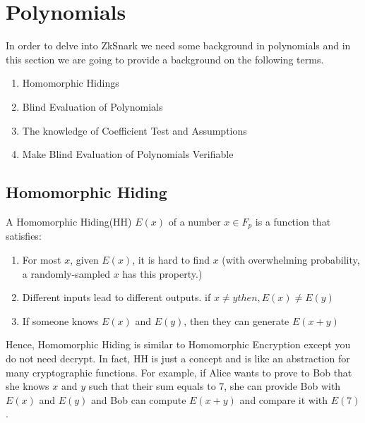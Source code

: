 \documentclass[twoside]{article}
\begin{document}
\section{Polynomials}
In order to delve into ZkSnark we need some background in polynomials and in this section we are going to provide a background on the following terms.
\begin{enumerate}[topsep=0pt,itemsep=-1ex,partopsep=1ex,parsep=1ex]
    \item Homomorphic Hidings
    \item Blind Evaluation of Polynomials
    \item The knowledge of Coefficient Test and Assumptions
    \item Make Blind Evaluation of Polynomials Verifiable
\end{enumerate}
\subsection{Homomorphic Hiding}
A Homomorphic Hiding(HH) $E(x)$ of a number $x \in F_p$ is a function that satisfies:
\begin{enumerate}[topsep=0pt,itemsep=-1ex,partopsep=1ex,parsep=1ex]
    \item For most $x$, given $E(x)$, it is hard to find $x$ (with overwhelming probability, a randomly-sampled $x$ has this property.)
    \item Different inputs lead to different outputs. if $x\neq y then, E(x)\neq E(y)$
    \item If someone knows $E(x)$ and $E(y)$, then they can generate $E(x+y)$
\end{enumerate}
Hence, Homomorphic Hiding is similar to Homomorphic Encryption except you do not need decrypt. In fact, HH is just a concept and is like an abstraction for many cryptographic functions. For example, if Alice wants to prove to Bob that she knows $x$ and $y$ such that their sum equals to $7$, she can provide Bob with $E(x)$ and $E(y)$ and Bob can compute $E(x+y)$ and compare it with $E(7)$.
\end{document}
